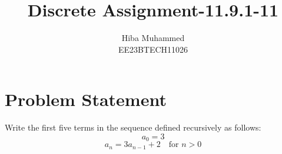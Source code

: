 \documentclass[12pt]{article}
\title{Discrete Assignment-11.9.1-11}
\author{Hiba Muhammed \\
        EE23BTECH11026}
\date{}
\begin{document}
\maketitle

\section*{Problem Statement}
Write the first five terms in the sequence defined recursively as follows:
\[ a_{0} = 3 \]
\[ a_{n} = 3a_{n-1} + 2 \quad \text{for } n > 0 \]

\end{document}
